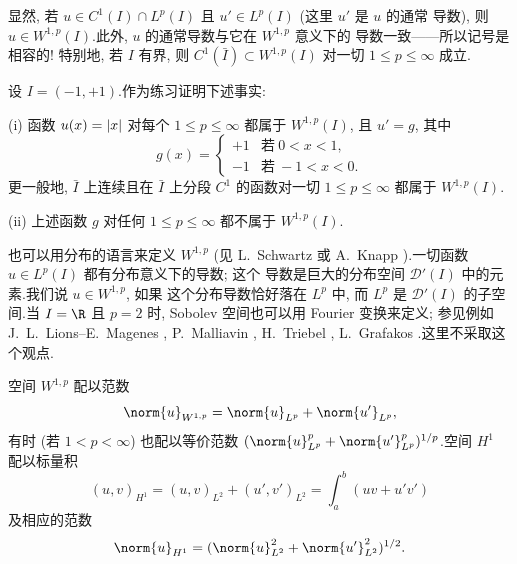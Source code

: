\begin{remark}
\label{rem:8.2}
显然, 若 $u\in C^1(I)\cap L^p(I)$ 且 $u'\in L^p(I)$ (这里 $u'$ 是 $u$ 的通常
导数), 则 $u\in W^{1,p}(I)$.此外, $u$ 的通常导数与它在 $W^{1,p}$ 意义下的
导数一致——所以记号是相容的! 特别地, 若 $I$ 有界, 则
$C^1(\bar I)\subset W^{1,p}(I)$ 对一切 $1\le p\le\infty$ 成立.
\end{remark}

 设 $I=(-1,+1)$.作为练习证明下述事实:

\noindent (i) 函数 $u(x)=\left|x\right|$ 对每个 $1\le p\le\infty$ 都属于 $W^{1,p}(I)$,
且 $u'=g$, 其中
\begin{equation*}
g(x)=
\begin{cases}
+1 & \text{若}\ 0<x<1,\\
-1 & \text{若}\ -1<x<0.
\end{cases}
\end{equation*}
更一般地, $\bar I$ 上连续且在 $\bar I$ 上分段 $C^1$ 的函数对一切
$1\le p\le\infty$ 都属于 $W^{1,p}(I)$.

\noindent (ii) 上述函数 $g$ 对任何 $1\le p\le\infty$ 都不属于 $W^{1,p}(I)$.

\begin{starremark}
\label{rem:8.3}
也可以用分布的语言来定义 $W^{1,p}$ (见 L.~Schwartz  或
A.~Knapp ).一切函数 $u\in L^p(I)$ 都有分布意义下的导数; 这个
导数是巨大的分布空间 $\mathcal{D}'(I)$ 中的元素.我们说 $u\in W^{1,p}$, 如果
这个分布导数恰好落在 $L^p$ 中, 而 $L^p$ 是 $\mathcal{D}'(I)$ 的子空间.当
$I=\R$ 且 $p=2$ 时, Sobolev 空间也可以用 Fourier 变换来定义; 参见例如
J.~L.~Lions--E.~Magenes , P.~Malliavin
, H.~Triebel , L.~Grafakos
.这里不采取这个观点.
\end{starremark}

\begin{notation}
空间 $W^{1,p}$ 配以范数
\begin{equation*}
\norm{u}_{W^{1,p}}=\norm{u}_{L^p}+\norm{u'}_{L^p},
\end{equation*}
有时 (若 $1<p<\infty$) 也配以等价范数
$(\norm{u}_{L^p}^p+\norm{u'}_{L^p}^p)^{1/p}$.空间 $H^1$ 配以标量积
\begin{equation*}
(u,v)_{H^1}=(u,v)_{L^2}+(u',v')_{L^2}=\int_a^b(uv+u'v')
\end{equation*}
及相应的范数
\begin{equation*}
\norm{u}_{H^1}=(\norm{u}_{L^2}^2+\norm{u'}_{L^2}^2)^{1/2}.
\end{equation*}
\end{notation}

